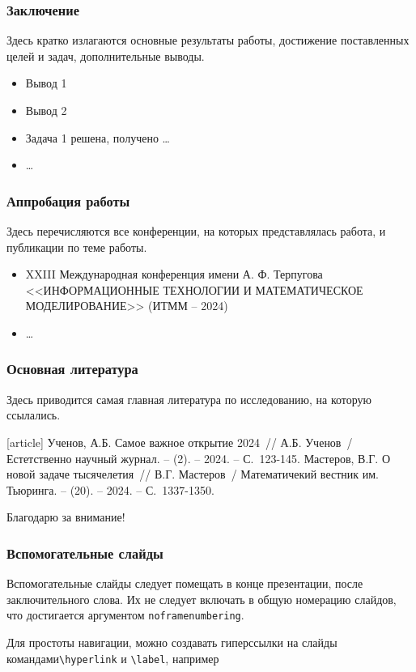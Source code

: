 \documentclass[12pt, aspectratio=1610]{beamer}
\begin{document}
\begin{frame}
	\frametitle{Заключение}
	\justifying
	Здесь кратко излагаются основные результаты работы, достижение поставленных целей и задач, дополнительные выводы.
	\begin{itemize}
		\item Вывод 1
		\item Вывод 2
		\item Задача 1 решена, получено \dots
		\item \dots
	\end{itemize}
\end{frame}

\begin{frame}
	\frametitle{Аппробация работы}
	\justifying
	Здесь перечисляются все конференции, на которых представлялась работа, и публикации по теме работы.
	\begin{itemize}
		\item XXIII Международная конференция имени А. Ф. Терпугова <<ИНФОРМАЦИОННЫЕ ТЕХНОЛОГИИ И МАТЕМАТИЧЕСКОЕ МОДЕЛИРОВАНИЕ>> (ИТММ -- 2024)
		\item \dots
	\end{itemize}
\end{frame}

\begin{frame}
	\frametitle{Основная литература}
	Здесь приводится самая главная литература по исследованию, на которую ссылались.
	\begin{thebibliography}{9}
		[article]
		Ученов, А.Б. Самое важное открытие 2024~// А.Б. Ученов~/ Естетственно научный журнал. -- (2). -- 2024. -- С.~123-145.
		Мастеров, В.Г. О новой задаче тысячелетия~// В.Г. Мастеров~/ Математичекий вестник им. Тьюринга. -- (20). -- 2024. -- С.~1337-1350.
	\end{thebibliography}
\end{frame}

\begin{frame}[plain]
	\centering\Huge Благодарю за внимание!
\end{frame}

\begin{frame}
	\frametitle{Вспомогательные слайды}	
	\justifying
	\label{Results1}
	Вспомогательные слайды следует помещать в конце презентации, после заключительного слова. Их не следует включать в общую номерацию слайдов, что достигается аргументом \verb|noframenumbering|.
	
	Для простоты навигации, можно создавать гиперссылки на слайды командами\linebreak \verb|\hyperlink| и \verb|\label|, например
	
	\hyperlink{Exp1}{}

\end{frame}

\end{document}
